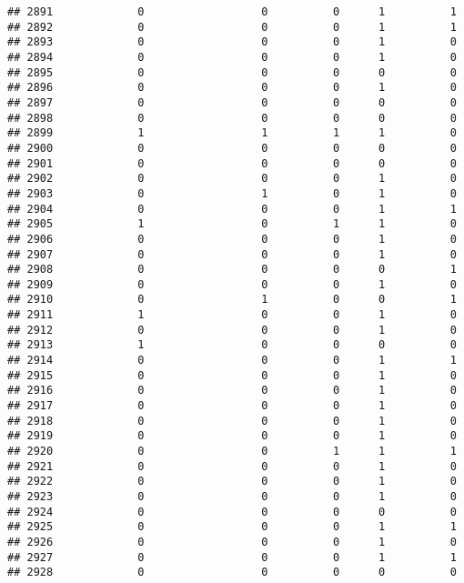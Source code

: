 \documentclass[
]{article}
\begin{document}
\begin{verbatim}
## 2891             0                  0          0      1          1
## 2892             0                  0          0      1          1
## 2893             0                  0          0      1          0
## 2894             0                  0          0      1          0
## 2895             0                  0          0      0          0
## 2896             0                  0          0      1          0
## 2897             0                  0          0      0          0
## 2898             0                  0          0      0          0
## 2899             1                  1          1      1          0
## 2900             0                  0          0      0          0
## 2901             0                  0          0      0          0
## 2902             0                  0          0      1          0
## 2903             0                  1          0      1          0
## 2904             0                  0          0      1          1
## 2905             1                  0          1      1          0
## 2906             0                  0          0      1          0
## 2907             0                  0          0      1          0
## 2908             0                  0          0      0          1
## 2909             0                  0          0      1          0
## 2910             0                  1          0      0          1
## 2911             1                  0          0      1          0
## 2912             0                  0          0      1          0
## 2913             1                  0          0      0          0
## 2914             0                  0          0      1          1
## 2915             0                  0          0      1          0
## 2916             0                  0          0      1          0
## 2917             0                  0          0      1          0
## 2918             0                  0          0      1          0
## 2919             0                  0          0      1          0
## 2920             0                  0          1      1          1
## 2921             0                  0          0      1          0
## 2922             0                  0          0      1          0
## 2923             0                  0          0      1          0
## 2924             0                  0          0      0          0
## 2925             0                  0          0      1          1
## 2926             0                  0          0      1          0
## 2927             0                  0          0      1          1
## 2928             0                  0          0      0          0

\end{verbatim}
\end{document}

